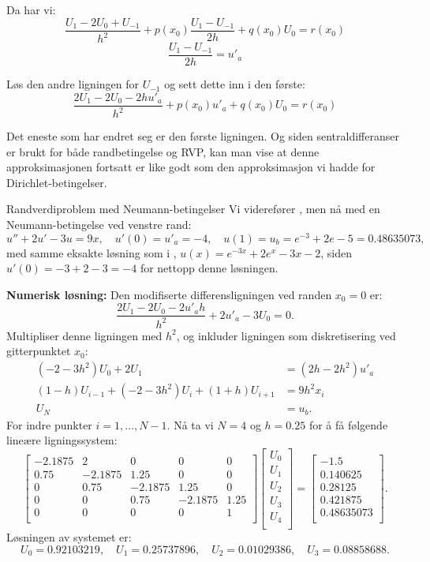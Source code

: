 Da har vi:
\[
\frac{U_1 - 2U_0 + U_{-1}}{h^2} + p(x_0)\frac{U_1 - U_{-1}}{2h} + q(x_0)U_0 = r(x_0)
\]
\[
\frac{U_1 - U_{-1}}{2h} = u'_a
\]

Løs den andre ligningen for \(U_{-1}\) og sett dette inn i den første:
\[
\frac{2U_1 - 2U_0 - 2hu'_a}{h^2} + p(x_0)u'_a + q(x_0)U_0 = r(x_0)
\]

Det eneste som har endret seg er den første ligningen. Og siden sentraldifferanser er brukt for både randbetingelse og RVP, kan man vise at denne approksimasjonen fortsatt er like godt som den approksimasjon vi hadde for Dirichlet-betingelser.

\begin{eks}{Randverdiproblem med Neumann-betingelser}
Vi viderefører , men nå med en Neumann-betingelse ved venstre rand:
\[
u'' + 2u' - 3u = 9x, \quad u'(0) = u'_a = -4, \quad u(1) = u_b = e^{-3} + 2e - 5 = 0.48635073,
\]
med samme eksakte løsning som i ,
$u(x) = e^{-3x} + 2e^x - 3x - 2$, siden $u'(0) = -3 + 2 - 3 = -4$ for nettopp denne løsningen.
\end{eks}

\textbf{Numerisk løsning: }Den modifiserte differensligningen ved randen \( x_0 = 0 \) er:
\[
\frac{2U_1 - 2U_0 - 2u'_a h}{h^2} + 2u'_a - 3U_0 = 0.
\]
Multipliser denne ligningen med \( h^2 \), og inkluder ligningen som diskretisering ved gitterpunktet \( x_0 \):
\begin{align*}
(-2 - 3h^2)U_0 + 2U_1 &= (2h - 2h^2)u'_a \\ 
(1 - h)U_{i-1} + (-2 - 3h^2)U_i + (1 + h)U_{i+1} &= 9h^2 x_i\\
U_N &= u_b.
\end{align*}
For indre punkter \( i = 1, \dots, N-1 \). Nå ta vi \( N = 4 \) og \( h = 0.25 \) for å få følgende lineære ligningssystem:
\[
\begin{bmatrix}
-2.1875 & 2       & 0       & 0       & 0 \\
0.75    & -2.1875 & 1.25    & 0       & 0 \\
0       & 0.75    & -2.1875 & 1.25    & 0 \\
0       & 0       & 0.75    & -2.1875 & 1.25 \\
0       & 0       & 0       & 0       & 1 \\
\end{bmatrix}
\begin{bmatrix}
U_0 \\
U_1 \\
U_2 \\
U_3 \\
U_4 \\
\end{bmatrix}
=
\begin{bmatrix}
-1.5 \\
0.140625 \\
0.28125 \\
0.421875 \\
0.48635073 \\
\end{bmatrix}.
\]
Løsningen av systemet er:
\[
U_0 = 0.92103219, \quad U_1 = 0.25737896, \quad U_2 = 0.01029386, \quad U_3 = 0.08858688.
\]

